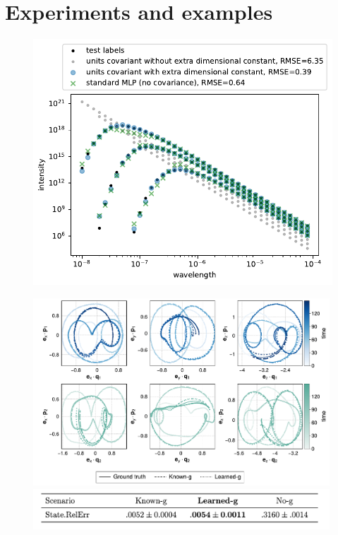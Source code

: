 \documentclass{article}
\theoremstyle{plain}
\theoremstyle{definition}
\theoremstyle{remark}
\begin{document}
\section{Experiments and examples}\label{sec:experiments}
\begin{figure}[t!]
    \centering
    \begin{minipage}{0.45\textwidth}
    \includegraphics[height=0.85\textwidth]{units}
    \end{minipage}
    \begin{minipage}{0.5\textwidth}
    \centering
    \includegraphics[width=0.99\textwidth]{pendulum}
    \includegraphics[width=0.99\textwidth]{table}

\end{minipage}
\end{figure}
\end{document}
